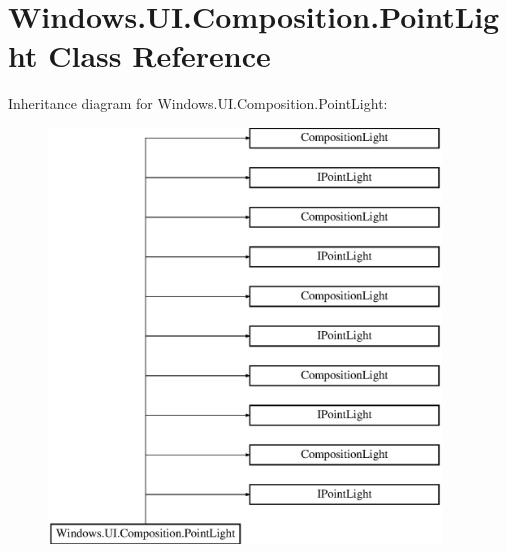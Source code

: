 \hypertarget{class_windows_1_1_u_i_1_1_composition_1_1_point_light}{}\section{Windows.\+U\+I.\+Composition.\+Point\+Light Class Reference}
\label{class_windows_1_1_u_i_1_1_composition_1_1_point_light}
Inheritance diagram for Windows.\+U\+I.\+Composition.\+Point\+Light\+:\begin{figure}[H]
\begin{center}
\leavevmode
\includegraphics[height=11.000000cm]{class_windows_1_1_u_i_1_1_composition_1_1_point_light}
\end{center}
\end{figure}
